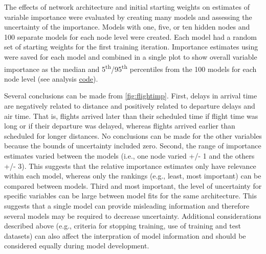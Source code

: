\documentclass[article,shortnames]{jss}
\begin{document}
The effects of network architecture and initial starting weights on estimates of variable importance were evaluated by creating many models and assessing the uncertainty of the importance.  Models with one, five, or ten hidden nodes and 100 separate models for each node level were created.  Each model had a random set of starting weights for the first training iteration.  Importance estimates using  were saved for each model and combined in a single plot to show overall variable importance as the median and 5\textsuperscript{th}/95\textsuperscript{th} percentiles from the 100 models for each node level (see analysis \href{https://raw.githubusercontent.com/fawda123/nnt_manu/master/flightimp.R}{code}). 

Several conclusions can be made from \cref{fig:flightimp}.  First, delays in arrival time are negatively related to distance and positively related to departure delays and air time.  That is, flights arrived later than their scheduled time if flight time was long or if their departure was delayed, whereas flights arrived earlier than scheduled for longer distances.  No conclusions can be made for the other variables because the bounds of uncertainty included zero.  Second, the range of importance estimates varied between the models (i.e., one node  varied +/- 1 and the others +/- 3).  This suggests that the relative importance estimates only have relevance within each model, whereas only the rankings (e.g., least, most important) can be compared between models.  Third and most important, the level of uncertainty for specific variables can be large between model fits for the same architecture.  This suggests that a single model can provide misleading information and therefore several models may be required to decrease uncertainty.  Additional considerations described above (e.g., criteria for stopping training, use of training and test datasets) can also affect the interpration of model information and should be considered equally during model development.
\end{document}
